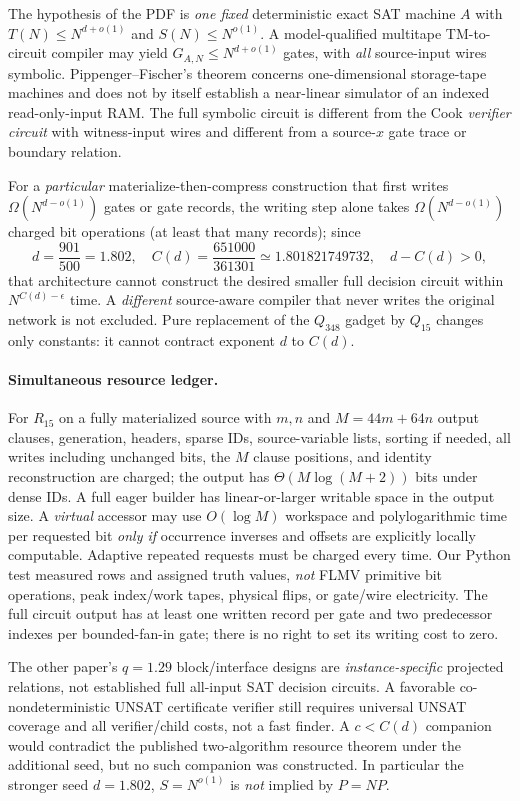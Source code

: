 \documentclass[11pt]{article}
\begin{document}
The hypothesis of the PDF is \emph{one fixed} deterministic exact
SAT machine \(A\) with \(T(N)\le N^{d+o(1)}\) and
\(S(N)\le N^{o(1)}\). A model-qualified multitape
TM-to-circuit compiler may yield
\(G_{A,N}\le N^{d+o(1)}\) gates, with \emph{all} source-input
wires symbolic. Pippenger--Fischer's theorem concerns
one-dimensional storage-tape machines and does not by itself
establish a near-linear simulator of an indexed read-only-input
RAM. The full symbolic circuit is different from the Cook
\emph{verifier circuit} with witness-input wires and different
from a source-\(x\) gate trace or boundary relation.

For a \emph{particular} materialize-then-compress construction that
first writes \(\Omega(N^{d-o(1)})\) gates or gate records,
the writing step alone takes \(\Omega(N^{d-o(1)})\)
charged bit operations (at least that many records); since
\[
d=\frac{901}{500}=1.802,\quad
C(d)=\frac{651000}{361301}
\simeq1.801821749732,\quad d-C(d)>0,
\]
that architecture cannot construct the desired smaller
full decision circuit within \(N^{C(d)-\epsilon}\) time.
A \emph{different} source-aware compiler that never writes the
original network is not excluded. Pure replacement of the
\(Q_{348}\) gadget by \(Q_{15}\) changes only constants:
it cannot contract exponent \(d\) to \(C(d)\).

\paragraph{Simultaneous resource ledger.}
For \(R_{15}\) on a fully materialized source with \(m,n\) and
\(M=44m+64n\) output clauses, generation, headers, sparse IDs,
source-variable lists, sorting if needed, all writes including
unchanged bits, the \(M\) clause positions, and identity reconstruction
are charged; the output has \(\Theta(M\log(M+2))\) bits under dense IDs.
A full eager builder has linear-or-larger writable space in
the output size. A \emph{virtual} accessor may use \(O(\log M)\)
workspace and polylogarithmic time per requested bit
\emph{only if} occurrence inverses and offsets are explicitly
locally computable. Adaptive repeated requests must be charged
every time. Our Python test measured rows and assigned
truth values, \emph{not} FLMV primitive bit operations,
peak index/work tapes, physical flips, or gate/wire electricity.
The full circuit output has at least one written record per
gate and two predecessor indexes per bounded-fan-in gate;
there is no right to set its writing cost to zero.

The other paper's \(q=1.29\) block/interface designs are
\emph{instance-specific} projected relations, not established
full all-input SAT decision circuits. A favorable
co-nondeterministic UNSAT certificate verifier still
requires universal UNSAT coverage and all verifier/child
costs, not a fast finder. A \(c<C(d)\) companion would
contradict the published two-algorithm resource theorem
under the additional seed, but no such companion was
constructed. In particular the stronger seed \(d=1.802\),
\(S=N^{o(1)}\) is \emph{not} implied by \(P=NP\).
\end{document}
